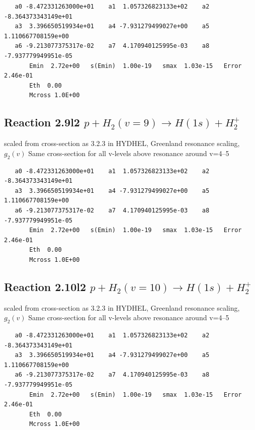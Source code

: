 \documentclass[12pt,dvipdfmx]{article}
\begin{document}
\begin{small}\begin{verbatim}
   a0 -8.472331263000e+01    a1  1.057326823133e+02    a2 -8.364373343149e+01
   a3  3.396650519934e+01    a4 -7.931279499027e+00    a5  1.110667708159e+00
   a6 -9.213077375317e-02    a7  4.170940125995e-03    a8 -7.937779949951e-05
       Emin  2.72e+00   s(Emin)  1.00e-19   smax  1.03e-15   Error  2.46e-01
       Eth  0.00
       Mcross 1.0E+00
\end{verbatim}\end{small}

\subsection{
Reaction 2.9l2 $   p + H_2(v=9) \rightarrow H(1s) + H_2^+$}

scaled from cross-section as 3.2.3 in HYDHEL, Greenland resonance scaling, \cite{kn:Green} $g_2(v)$
Same cross-section for all v-levels above resonance around v=4--5

\begin{small}\begin{verbatim}
   a0 -8.472331263000e+01    a1  1.057326823133e+02    a2 -8.364373343149e+01
   a3  3.396650519934e+01    a4 -7.931279499027e+00    a5  1.110667708159e+00
   a6 -9.213077375317e-02    a7  4.170940125995e-03    a8 -7.937779949951e-05
       Emin  2.72e+00   s(Emin)  1.00e-19   smax  1.03e-15   Error  2.46e-01
       Eth  0.00
       Mcross 1.0E+00
\end{verbatim}\end{small}

\subsection{
Reaction 2.10l2 $   p + H_2(v=10) \rightarrow H(1s) + H_2^+$}

scaled from cross-section as 3.2.3 in HYDHEL, Greenland resonance scaling, \cite{kn:Green} $g_2(v)$
Same cross-section for all v-levels above resonance around v=4--5

\begin{small}\begin{verbatim}
   a0 -8.472331263000e+01    a1  1.057326823133e+02    a2 -8.364373343149e+01
   a3  3.396650519934e+01    a4 -7.931279499027e+00    a5  1.110667708159e+00
   a6 -9.213077375317e-02    a7  4.170940125995e-03    a8 -7.937779949951e-05
       Emin  2.72e+00   s(Emin)  1.00e-19   smax  1.03e-15   Error  2.46e-01
       Eth  0.00
       Mcross 1.0E+00
\end{verbatim}\end{small}
\end{document}
